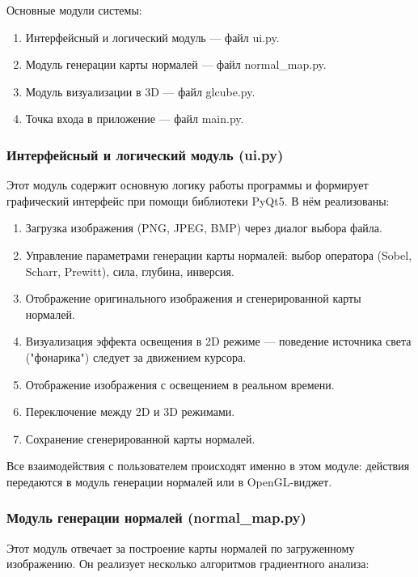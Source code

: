 Основные модули системы:

\begin{enumerate}
	\item Интерфейсный и логический модуль — файл ui.py.
	\item Модуль генерации карты нормалей — файл normal\_map.py.
	\item Модуль визуализации в 3D — файл glcube.py.
	\item Точка входа в приложение — файл main.py.
\end{enumerate}

\subsubsection{Интерфейсный и логический модуль (ui.py)}

Этот модуль содержит основную логику работы программы и формирует графический интерфейс при помощи библиотеки PyQt5. В нём реализованы:

\begin{enumerate}
	\item Загрузка изображения (PNG, JPEG, BMP) через диалог выбора файла.
	\item Управление параметрами генерации карты нормалей: выбор оператора (Sobel, Scharr, Prewitt), сила, глубина, инверсия.
	\item Отображение оригинального изображения и сгенерированной карты нормалей.
	\item Визуализация эффекта освещения в 2D режиме — поведение источника света ("фонарика") следует за движением курсора.
	\item Отображение изображения с освещением в реальном времени.
	\item Переключение между 2D и 3D режимами.
	\item Сохранение сгенерированной карты нормалей.
\end{enumerate}

Все взаимодействия с пользователем происходят именно в этом модуле: действия передаются в модуль генерации нормалей или в OpenGL-виджет.

\subsubsection{Модуль генерации нормалей (normal\_map.py)}

Этот модуль отвечает за построение карты нормалей по загруженному изображению. Он реализует несколько алгоритмов градиентного анализа:

